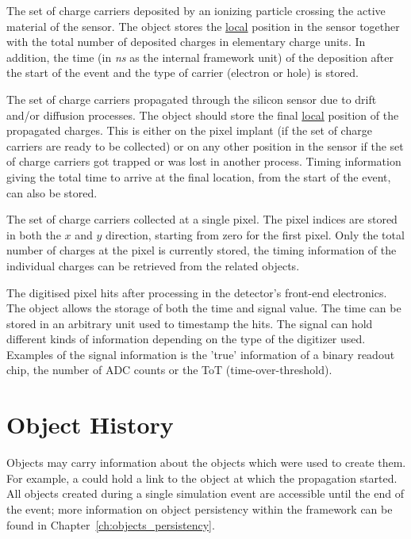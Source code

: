 The set of charge carriers deposited by an ionizing particle crossing the active material of the sensor.
The object stores the \underline{local} position in the sensor together with the total number of deposited charges in elementary charge units.
In addition, the time (in \textit{ns} as the internal framework unit) of the deposition after the start of the event and the type of carrier (electron or hole) is stored.

The set of charge carriers propagated through the silicon sensor due to drift and/or diffusion processes.
The object should store the final \underline{local} position of the propagated charges.
This is either on the pixel implant (if the set of charge carriers are ready to be collected) or on any other position in the sensor if the set of charge carriers got trapped or was lost in another process.
Timing information giving the total time to arrive at the final location, from the start of the event, can also be stored.

The set of charge carriers collected at a single pixel.
The pixel indices are stored in both the $x$ and $y$ direction, starting from zero for the first pixel.
Only the total number of charges at the pixel is currently stored, the timing information of the individual charges can be retrieved from the related  objects.

The digitised pixel hits after processing in the detector's front-end electronics.
The object allows the storage of both the time and signal value.
The time can be stored in an arbitrary unit used to timestamp the hits.
The signal can hold different kinds of information depending on the type of the digitizer used.
Examples of the signal information is the 'true' information of a binary readout chip, the number of ADC counts or the ToT (time-over-threshold).

\section{Object History}
\label{sec:objhistory}

Objects may carry information about the objects which were used to create them.
For example, a  could hold a link to the  object at which the propagation started.
All objects created during a single simulation event are accessible until the end of the event; more information on object persistency within the framework can be found in Chapter~\ref{ch:objects_persistency}.

